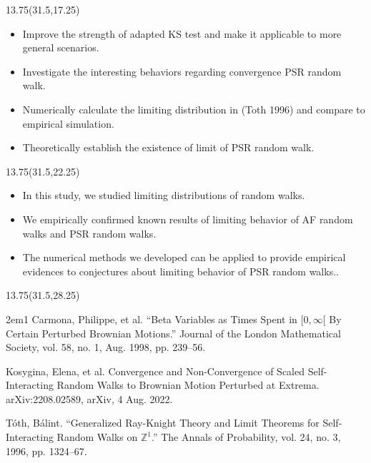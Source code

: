 \documentclass[a0]{a0poster}
\begin{document}
\begin{textblock}{13.75}(31.5,17.25)
\medskip
{}\\  %
\begin{itemize}
    \item Improve the strength of adapted KS test and make it applicable to more general scenarios.
    \item Investigate the interesting behaviors regarding convergence PSR random walk.
    \item Numerically calculate the limiting distribution in (Toth 1996) and compare to empirical simulation.
    \item Theoretically establish the existence of limit of PSR random walk.
\end{itemize}
\end{textblock}

\begin{textblock}{13.75}(31.5,22.25)
\medskip
{}\\  %
\begin{itemize}
    \item In this study, we studied limiting distributions of random walks.
    \item We empirically confirmed known results of limiting behavior of AF random walks and PSR random walks.
    \item The numerical methods we developed can be applied to provide empirical evidences to conjectures about limiting behavior of PSR random walks..
\end{itemize}
\end{textblock}

\begin{textblock}{13.75}(31.5,28.25)
\medskip
{}\\  %

\begin{hangparas}{2em}{1}
Carmona, Philippe, et al. “Beta Variables as Times Spent in $[0, \infty[$ By Certain Perturbed Brownian Motions.” Journal of the London Mathematical Society, vol. 58, no. 1, Aug. 1998, pp. 239–56.

Kosygina, Elena, et al. Convergence and Non-Convergence of Scaled Self-Interacting Random Walks to Brownian Motion Perturbed at Extrema. arXiv:2208.02589, arXiv, 4 Aug. 2022.

Tóth, Bálint. “Generalized Ray-Knight Theory and Limit Theorems for Self-Interacting Random Walks on $\mathbb{Z}^ 1$.” The Annals of Probability, vol. 24, no. 3, 1996, pp. 1324–67.
\end{hangparas}

\end{textblock}
\end{document}
